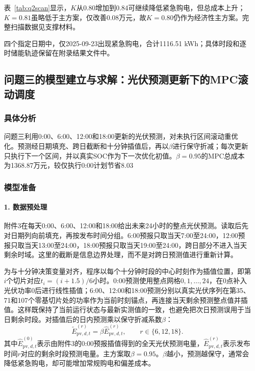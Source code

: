 \documentclass{cumcmthesis}
\begin{document}
表~\ref{tab:q2scan}显示，$K$从0.80增加到0.84可继续降低紧急购电，但总成本上升；$K=0.81$虽略低于主方案，仅改善0.08万元，故$K=0.80$仍作为经济性主方案。完整扫描数据见支撑材料。

四个指定日期中，仅2025-09-23出现紧急购电，合计1116.51 kWh；具体时段和逐时储能轨迹保留在附录结果文件中。

\subsection{问题三的模型建立与求解：光伏预测更新下的MPC滚动调度}

\subsubsection{具体分析}

问题三利用0:00、6:00、12:00和18:00更新的光伏预测，对未执行区间滚动重优化。预测经日期填充、跨日截断和十分钟插值后，再以$\beta$进行保守折减；每次更新只执行下一个区间，并以真实SOC作为下一次优化初值。$\beta=0.95$的MPC总成本为1368.87万元，较仅执行0:00计划节省8.03%

\subsubsection{模型准备}

\paragraph{1. 数据预处理}

附件3在每天0:00、6:00、12:00和18:00给出未来24小时的整点光伏预测。读取后先对日期列向前填充，再按发布时间分组。6:00预报只取当天7:00至24:00，12:00预报只取当天13:00至24:00，18:00预报只取当天19:00至24:00，跨日部分不进入当天剩余时域。这里的截断是信息边界处理，而不是对跨日预测值进行重新计算。

为与十分钟决策变量对齐，程序以每个十分钟时段的中心时刻作为插值位置，即第$i$个切片对应$t_i=(i+1.5)/6$小时。0:00预测使用整点网格$0,1,\ldots,24$，在0点补入光伏功率0后进行线性插值；6:00、12:00和18:00预测分别以真实光伏序列在第35、71和107个零基切片处的功率作为当前时刻锚点，再连接当天剩余预测整点值并插值。这样既保持了当前运行状态与最新实测值的一致，也避免把次日预测误用于当日剩余时段。对插值后的日内预测乘以保守折减系数$\beta$：
\begin{equation}
\widetilde E_{\mathrm{pv},d,t}^{(r)}=\beta\widehat E_{\mathrm{pv},d,t}^{(r)},\qquad r\in\{6,12,18\}.
\tag{16}
\end{equation}
其中$\widehat E^{(0)}_{\mathrm{pv},d,t}$表示由附件3的0:00预报插值得到的全天光伏预测电量，$\widehat E^{(r)}_{\mathrm{pv},d,t}$表示发布时间$r$对应的剩余时段预测电量。主方案取$\beta=0.95$。$\beta$越小，预测越保守，通常会降低紧急购电，却可能增加常规购电和偏差成本。
\end{document}
